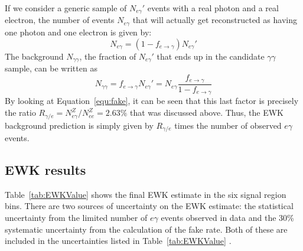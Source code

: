 
If we consider a generic sample of $N_{e\gamma}'$ events with a real photon and a real electron, 
the number of events $N_{e\gamma}$ that will actually get reconstructed as having one photon and one electron is given by:
\begin{equation}
N_{e\gamma}=(1-f_{e\rightarrow\gamma})N_{e\gamma}'
\end{equation}
The background $N_{\gamma\gamma}$, the fraction of $N_{e\gamma}'$ that ends up in the candidate
$\gamma\gamma$ sample, can be written as
\begin{equation}
N_{\gamma\gamma} = f_{e\rightarrow\gamma} N_{e\gamma}' = N_{e\gamma}\frac{f_{e\rightarrow\gamma}}{1-f_{e\rightarrow\gamma}}
\end{equation}
By looking at Equation~\ref{equ:fake}, it can be seen that this last factor is precisely the ratio $R_{\gamma/e} = N_{e\gamma}^Z/N_{ee}^Z = 2.63\%$ that was discussed above. Thus, the EWK background prediction is simply given by $R_{\gamma/e}$ times the number of observed $e\gamma$ events. 


\subsection{EWK results}
\label{sec:EWKresults}

Table~\ref{tab:EWKValue} shows the final EWK estimate in the six signal region bins. There are two sources of uncertainty on the EWK estimate: the statistical uncertainty from the limited number of $e\gamma$ events observed in data and the 30\% systematic uncertainty from the calculation of the fake rate. Both of these are included in the uncertainties listed in Table~\ref{tab:EWKValue} .


